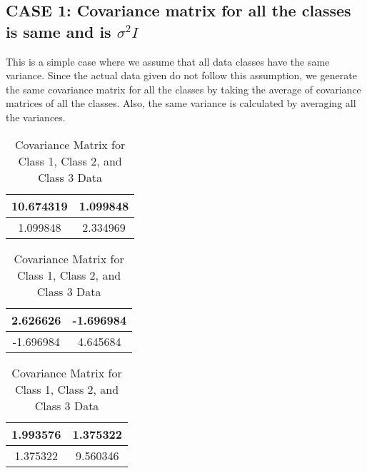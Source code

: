 \subsection{CASE 1: Covariance matrix for all the classes is same and is \textbf{$\sigma^2I$}}
This is a simple case where we assume that all data classes have the same variance. Since the actual data given do not follow this assumption, we generate the same covariance matrix for all the classes by taking the average of covariance matrices of all the classes. Also, the same variance is calculated by averaging all the variances.\\
\begin{table}[H]
    \begin{minipage}{0.37\textwidth}
        \centering
    
        \begin{tabular}{|c|c|}
        \hline
        10.674319 & 1.099848 \\
        \hline 
        1.099848 & 2.334969 \\
        \hline
        \end{tabular}
    \end{minipage}%
    \begin{minipage}{0.37\textwidth}
        \begin{tabular}{|c|c|}
        \hline
        2.626626 & -1.696984 \\
        \hline 
        -1.696984 & 4.645684 \\
        \hline
        \end{tabular}
    \end{minipage}%
    \begin{minipage}{0.37\textwidth}
        \begin{tabular}{|c|c|}
        \hline
        1.993576 & 1.375322 \\
        \hline 
        1.375322 & 9.560346 \\
        \hline
        \end{tabular}
    \end{minipage}
\caption{Covariance Matrix for Class 1, Class 2, and Class 3 Data}
\label{tab:Table2}
\end{table}


